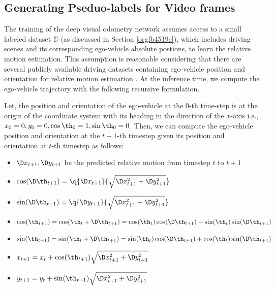 \documentclass[letterpaper, 12pt]{book}
\theoremstyle{definition}
\theoremstyle{definition}
\theoremstyle{definition}
\theoremstyle{definition}
\theoremstyle{definition}
\begin{document}
\subsection{Generating Pseduo-labels for Video frames}
\label{sec:org70fcf5d}
The training of the deep visual odometry network assumes access to a small
labeled dataset \(\DD\) (as discussed in Section \ref{orgfb4519e}), which includes driving
scenes and its corresponding ego-vehicle absolute postions, to learn the
relative motion estimation. This assumption is reasonable considering that there
are several publicly available driving datasets containing ego-vehicle position
and orientation for relative motion estimation
\cite{Geiger2012AreWR,Argoverse2}. At the inference time, we compute the
ego-vehicle trajectory with the following recursive formulation.

Let, the position and orientation of the ego-vehicle at the 0-th time-step is at
the origin of the coordinate system with its heading in the direction of the
\(x\)-axis i.e., \(x_{0}=0, y_{0}=0, \cos\th_{0}=1, \sin\th_{0}=0\). Then, we
can compute the ego-vehicle position and orientation at the \(t+1\)-th timestep
given its position and orientation at \(t\)-th timestep as follows:

\begin{itemize}
\item \(\D x_{t+1}, \D y_{t+1}\) be the predicted relative motion from timestep
\(t\) to \(t+1\)
\item \(\cos(\D\th_{t+1}) = \q{\D x_{t+1}}{\sqrt{\D x_{t+1}^{2}+\D y_{t+1}^{2}}}\)
\item \(\sin(\D\th_{t+1}) = \q{\D y_{t+1}}{\sqrt{\D x_{t+1}^{2}+\D y_{t+1}^{2}}}\)
\item \(\cos(\th_{t+1}) = \cos(\th_{t}+\D \th_{t+1}) =
  \cos(\th_{t})\cos(\D\th_{t+1})-\sin(\th_{t})\sin(\D\th_{t+1})\)
\item \(\sin(\th_{t+1}) = \sin(\th_{t}+\D \th_{t+1})=
  \sin(\th_{t})\cos(\D\th_{t+1})+\cos(\th_{t})\sin(\D\th_{t+1})\)
\item \(x_{t+1} = x_{t} + \cos(\th_{t+1})\sqrt{\D x_{t+1}^{2}+\D y_{t+1}^{2}}\)
\item \(y_{t+1} = y_{t} + \sin(\th_{t+1})\sqrt{\D x_{t+1}^{2}+\D y_{t+1}^{2}}\)
\end{itemize}
\end{document}
